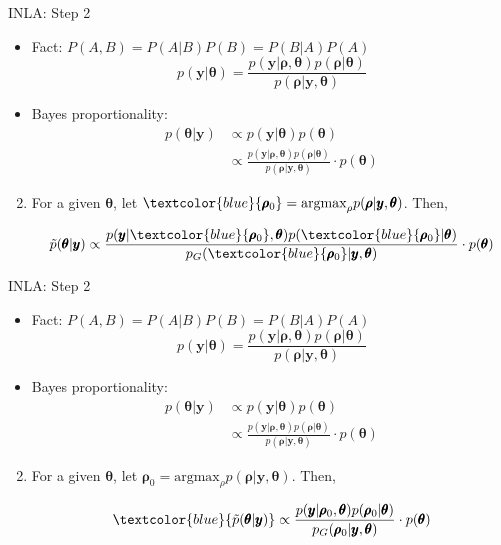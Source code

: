 \documentclass{beamer}
\begin{document}
\begin{frame}{INLA: Step 2} {}
\begin{itemize}
\item Fact: $P(A,B) = P(A|B) P(B) = P(B|A) P(A)$
$$ p(\pmb{y} | \pmb{\theta}) = \frac{p(\pmb{y} | \pmb{\rho}, \pmb{\theta}) p(\pmb{\rho} | \pmb{\theta})} {p(\pmb{\rho} | \pmb{y}, \pmb{\theta})} $$
\item Bayes proportionality:
    \begin{align}
    p(\pmb{\theta}|\pmb{y}) & \propto p(\pmb{y}|\pmb{\theta})p(\pmb{\theta}) \nonumber \\
    & \propto \frac{p(\pmb{y} | \pmb{\rho}, \pmb{\theta}) p(\pmb{\rho} | \pmb{\theta})}{p(\pmb{\rho} | \pmb{y}, \pmb{\theta})} \cdot p(\pmb{\theta}) \nonumber
    \end{align}
\end{itemize}

\begin{enumerate}
\setcounter{enumi}{1}
\item For a given $\pmb{\theta}$, let $\textcolor{blue}{\pmb{\rho}_{0}} = \text{argmax}_{\rho}p(\pmb{\rho}|\pmb{y},\pmb{\theta})$. Then,

$$ \tilde{p}(\pmb{\theta}|\pmb{y})  \propto  \frac{
p(\pmb{y} | \textcolor{blue}{\pmb{\rho}_{0}}, \pmb{\theta})
p(\textcolor{blue}{\pmb{\rho}_{0}} | \pmb{\theta})}
{p_{G}(\textcolor{blue}{\pmb{\rho}_{0}} | \pmb{y}, \pmb{\theta})} \cdot p(\pmb{\theta}) $$

\end{enumerate}
\end{frame}

\begin{frame}{INLA: Step 2}{}
\begin{itemize}
\item Fact: $P(A,B) = P(A|B) P(B) = P(B|A) P(A)$
$$ p(\pmb{y} | \pmb{\theta}) = \frac{p(\pmb{y} | \pmb{\rho}, \pmb{\theta}) p(\pmb{\rho} | \pmb{\theta})} {p(\pmb{\rho} | \pmb{y}, \pmb{\theta})} $$
\item Bayes proportionality:
    \begin{align}
    p(\pmb{\theta}|\pmb{y}) & \propto p(\pmb{y}|\pmb{\theta})p(\pmb{\theta}) \nonumber \\
    & \propto \frac{p(\pmb{y} | \pmb{\rho}, \pmb{\theta}) p(\pmb{\rho} | \pmb{\theta})}{p(\pmb{\rho} | \pmb{y}, \pmb{\theta})} \cdot p(\pmb{\theta}) \nonumber
    \end{align}
\end{itemize}

\begin{enumerate}
\setcounter{enumi}{1}
\item For a given $\pmb{\theta}$, let $\pmb{\rho}_{0} = \text{argmax}_{\rho}p(\pmb{\rho}|\pmb{y},\pmb{\theta})$. Then,

$$ \textcolor{blue}{\tilde{p}(\pmb{\theta}|\pmb{y})}  \propto  \frac{p(\pmb{y} | \pmb{\rho}_{0}, \pmb{\theta}) p(\pmb{\rho}_{0} | \pmb{\theta})}{p_{G}(\pmb{\rho}_{0} | \pmb{y}, \pmb{\theta})} \cdot p(\pmb{\theta}) $$

\end{enumerate}
\end{frame}
\end{document}
